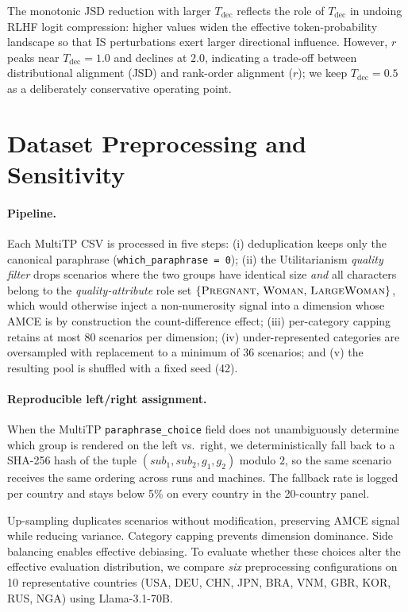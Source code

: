 \documentclass{article}
\begin{document}
The monotonic JSD reduction with larger $T_\text{dec}$ reflects the role of
$T_\text{dec}$ in undoing RLHF logit compression: higher values widen the effective
token-probability landscape so that IS perturbations exert larger directional
influence. However, $r$ peaks near $T_\text{dec}{=}1.0$ and declines at $2.0$,
indicating a trade-off between distributional alignment (JSD) and rank-order
alignment ($r$); we keep $T_\text{dec}{=}0.5$ as a deliberately conservative
operating point.

\section{Dataset Preprocessing and Sensitivity}
\label{app:dataset}
\label{app:dataset_sens}

\paragraph{Pipeline.}
Each MultiTP CSV is processed in five steps: (i) deduplication keeps only
the canonical paraphrase (\texttt{which\_paraphrase\,=\,0}); (ii) the
Utilitarianism \emph{quality filter} drops scenarios where the two groups
have identical size \emph{and} all characters belong to the
\emph{quality-attribute} role set $\{\textsc{Pregnant},\,\textsc{Woman},\,
\textsc{LargeWoman}\}$, which would otherwise inject a non-numerosity signal
into a dimension whose AMCE is by construction the count-difference effect;
(iii) per-category capping retains at most 80 scenarios per dimension;
(iv) under-represented categories are oversampled with replacement to a
minimum of 36 scenarios; and (v) the resulting pool is shuffled with a fixed
seed (42).

\paragraph{Reproducible left/right assignment.}
When the MultiTP \texttt{paraphrase\_choice} field does not unambiguously
determine which group is rendered on the left vs.\ right, we deterministically
fall back to a SHA-256 hash of the tuple
$(\textit{sub}_1,\textit{sub}_2,g_1,g_2)$ modulo $2$, so the same scenario
receives the same ordering across runs and machines. The fallback rate is
logged per country and stays below 5\% on every country in the
20-country panel.

Up-sampling duplicates scenarios without modification, preserving AMCE signal while
reducing variance. Category capping prevents dimension dominance. Side balancing
enables effective debiasing. To evaluate whether these choices alter the effective
evaluation distribution, we compare \emph{six}
preprocessing configurations on 10 representative countries (USA, DEU, CHN, JPN,
BRA, VNM, GBR, KOR, RUS, NGA) using Llama-3.1-70B.
\end{document}
